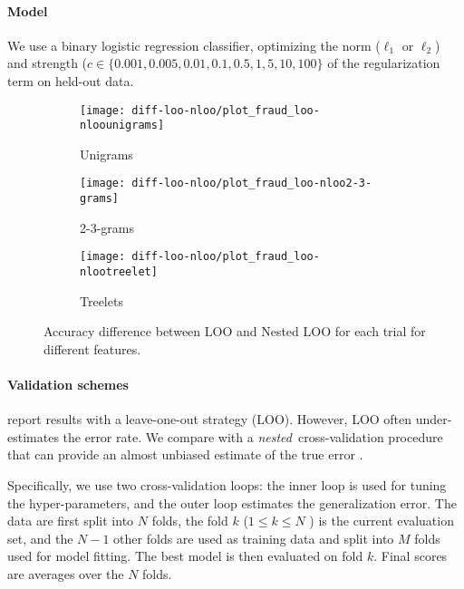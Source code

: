 \documentclass[11pt,letterpaper]{article}
\begin{document}
\paragraph{Model}

We use a binary logistic regression classifier, optimizing the norm ($\ell_1$ or $\ell_2$) and strength ($c \in \{0.001, 0.005, 0.01, 0.1, 0.5, 1, 5, 10, 100\}$ of the regularization term on held-out data.


\begin{figure*}[!ht]
\begin{subfigure}{.3\textwidth}
 \centering
 \texttt{[image: diff-loo-nloo/plot\_fraud\_loo-nloounigrams]}
 \caption{Unigrams}
 \label{fig:sfig1}
\end{subfigure}%
\begin{subfigure}{.3\textwidth}
 \centering
 \texttt{[image: diff-loo-nloo/plot\_fraud\_loo-nloo2-3-grams]}
 \caption{2-3-grams}
 \label{fig:sfig2}
\end{subfigure}
\begin{subfigure}{.3\textwidth}
 \centering
 \texttt{[image: diff-loo-nloo/plot\_fraud\_loo-nlootreelet]}
 \caption{Treelets}
 \label{fig:sfig3}
\end{subfigure}%
\caption{Accuracy difference between LOO and Nested LOO for each trial for different features.}
\label{fig:diffloo}
\end{figure*}

\paragraph{Validation schemes}

 report results with a leave-one-out strategy (LOO). 
However, LOO often under-estimates the error rate. 
We compare with a {\em nested}~cross-validation procedure that can provide an almost unbiased estimate of the true error \cite{varma_bias_2006,scheffer_error_1999}. 




Specifically, we use two cross-validation loops: the inner loop is used for tuning the hyper-parameters, and the outer loop estimates the generalization error. 
The data are first split into $N$ folds, 
the fold $k$ ($1 \leq k \leq N$ ) is the current evaluation set, and the $N-1$ other folds are used as training data and split into $M$ folds used for model fitting. 
The best model is then evaluated on fold $k$. 
Final scores are averages over the $N$ folds.
\end{document}
